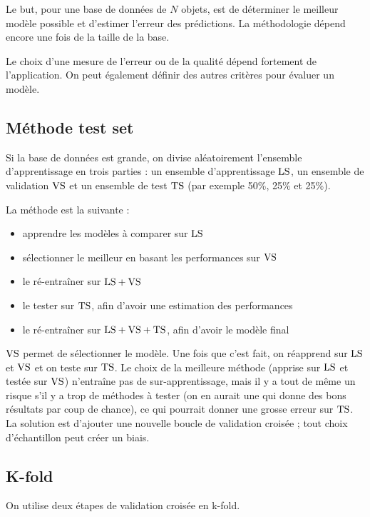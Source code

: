 Le but, pour une base de données de $N$ objets, est de déterminer le meilleur modèle possible et d'estimer l'erreur des prédictions. La méthodologie dépend encore une fois de la taille de la base.

Le choix d'une mesure de l'erreur ou de la qualité dépend fortement de l'application. On peut également définir des autres critères pour évaluer un modèle.

	\subsection{Méthode test set}
	
	Si la base de données est grande, on divise aléatoirement l'ensemble d'apprentissage en trois parties : un ensemble d'apprentissage $\text{LS}$, un ensemble de validation $\text{VS}$ et un ensemble de test $\text{TS}$ (par exemple 50\%, 25\% et 25\%).
	
	
	La méthode est la suivante :
	
	\begin{itemize}
		\item apprendre les modèles à comparer sur $\text{LS}$
		\item sélectionner le meilleur en basant les performances sur $\text{VS}$
		\item le ré-entraîner sur $\text{LS} + \text{VS}$
		\item le tester sur $\text{TS}$, afin d'avoir une estimation des performances
		\item le ré-entraîner sur $\text{LS} + \text{VS} + \text{TS}$, afin d'avoir le modèle final
	\end{itemize}
	
	$\text{VS}$ permet de sélectionner le modèle. Une fois que c'est fait, on réapprend sur $\text{LS}$ et $\text{VS}$ et on teste sur $\text{TS}$. Le choix de la meilleure méthode (apprise sur $\text{LS}$ et testée sur $\text{VS}$) n'entraîne pas de sur-apprentissage, mais il y a tout de même un risque s'il y a trop de méthodes à tester (on en aurait une qui donne des bons résultats par coup de chance), ce qui pourrait donner une grosse erreur sur $\text{TS}$. La solution est d'ajouter une nouvelle boucle de validation croisée ; tout choix d'échantillon peut créer un biais.
	
	\subsection{K-fold}
	
	On utilise deux étapes de validation croisée en k-fold.
	
